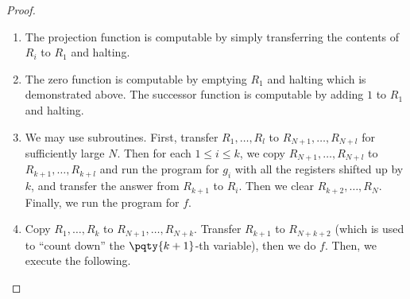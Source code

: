 \begin{proof}
    \begin{enumerate}[label=(\alph*)]
        \item The projection function is computable by simply transferring the contents of \(R_i\) to \(R_1\) and halting.
        \item The zero function is computable by emptying \(R_1\) and halting which is demonstrated above. The successor function is computable by adding \(1\) to \(R_1\) and halting.
        
        \begin{center}
        \end{center}

        \item We may use subroutines. First, transfer \(R_1, \ldots, R_l\) to \(R_{N + 1}, \ldots, R_{N + l}\) for sufficiently large \(N\). Then for each \(1 \leq i \leq k\), we copy \(R_{N + 1}, \ldots, R_{N + l}\) to \(R_{k + 1}, \ldots, R_{k + l}\) and run the program for \(g_i\) with all the registers shifted up by \(k\), and transfer the answer from \(R_{k + 1}\) to \(R_i\). Then we clear \(R_{k + 2}, \ldots, R_N\). Finally, we run the program for \(f\).
        
        \item Copy \(R_1, \ldots, R_k\) to \(R_{N + 1}, \ldots, R_{N + k}\). Transfer \(R_{k + 1}\) to \(R_{N + k + 2}\) (which is used to ``count down'' the \(\pqty{k + 1}\)-th variable), then we do \(f\). Then, we execute the following.
        
        \begin{center}
\end{center}
\end{enumerate}
\end{proof}
